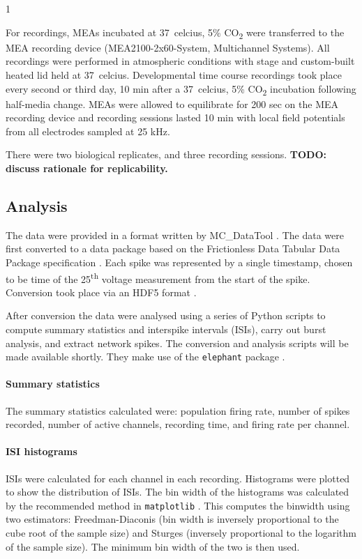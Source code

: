 1\documentclass[11pt]{article}
\begin{document}
{For recordings, MEAs incubated at \SI{37}{celcius}, 5\%
CO\textsubscript{2} were transferred to the MEA recording device
(MEA2100-2x60-System, Multichannel Systems). All recordings were
performed in atmospheric conditions with stage and custom-built heated
lid held at \SI{37}{celcius}. Developmental time course recordings took
place every second or third day, 10 min after a \SI{37}{celcius}, 5\%
CO\textsubscript{2} incubation following half-media change. MEAs were
allowed to equilibrate for 200 sec on the MEA recording device and
recording sessions lasted 10 min with local field potentials from all
electrodes sampled at 25 kHz.

\par There were two biological replicates, and three recording
sessions.  \textbf{TODO: discuss rationale for replicability.}

\subsection*{Analysis}






\par The data were provided in a format written by MC\_DataTool \cite{Systems2014-tw}. The data were first converted to a data package based on the Frictionless Data Tabular Data Package specification \cite{Walsh2017-nm}. Each spike was represented by a single timestamp, chosen to be time of the 25\textsuperscript{th} voltage measurement from the start of the spike. Conversion took place via an HDF5 format \cite{Eglen2014}.

\par After conversion the data were analysed using a series of Python scripts to compute summary statistics and interspike intervals (ISIs), carry out burst analysis, and extract network spikes. The conversion and analysis scripts will be made available shortly. They make use of the \texttt{elephant} package \cite{elephant_toolkit}.

\paragraph{Summary statistics} The summary statistics calculated were: population firing rate, number of spikes recorded, number of active channels, recording time, and firing rate per channel.

\paragraph{ISI histograms} ISIs were calculated for each channel in each recording. Histograms were plotted to show the distribution of ISIs. The bin width of the histograms was calculated by the recommended method in \texttt{matplotlib} \cite{Community2020-xp}. This computes the binwidth using two estimators: Freedman-Diaconis (bin width is inversely proportional to the cube root of the sample size) and Sturges (inversely proportional to the logarithm of the sample size). The minimum bin width of the two is then used.

}
\end{document}
